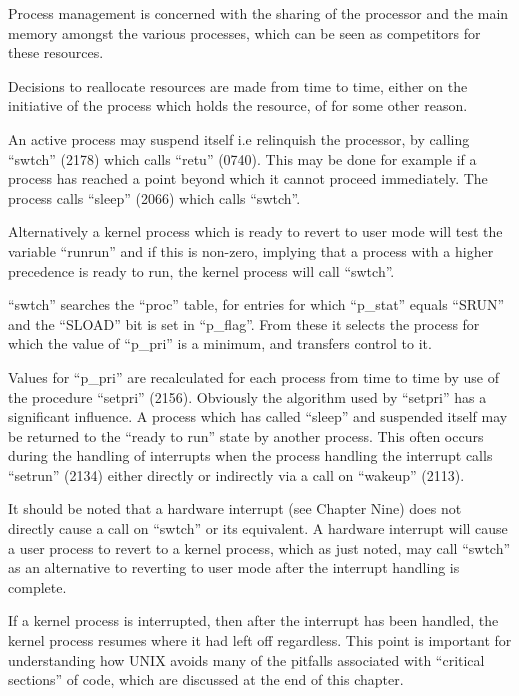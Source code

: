 %
%

Process management is concerned with
the sharing of the processor and the
main memory amongst the various
processes, which can be seen as competitors for these resources.

Decisions to reallocate resources are
made from time to time, either on the
initiative of the process which holds
the resource, of for some other reason.



An active process may suspend itself
i.e relinquish the processor, by calling ``swtch'' (2178) which calls ``retu''
(0740).
This may be done for example if a process has reached a point beyond which
it cannot proceed immediately. The process calls ``sleep'' (2066) which calls
``swtch''.

Alternatively a kernel process which is
ready to revert to user mode will test
the variable ``runrun'' and if this is
non-zero, implying that a process with
a higher precedence is ready to run,
the kernel process will call ``swtch''.

``swtch'' searches the ``proc'' table, for
entries for which ``p\_stat'' equals
``SRUN'' and the ``SLOAD'' bit is set in
``p\_flag''. From these it selects the
process for which the value of ``p\_pri''
is a minimum, and transfers control to it.

Values for ``p\_pri'' are recalculated for
each process from time to time by use
of the procedure ``setpri'' (2156). Obviously the algorithm used by ``setpri''
has a significant influence.
A process which has called ``sleep'' and
suspended itself may be returned to the
``ready to run'' state by another process. This often occurs during the
handling of interrupts when the process
handling the interrupt calls ``setrun''
(2134) either directly or indirectly
via a call on ``wakeup'' (2113).



It should be noted that a hardware
interrupt (see Chapter Nine) does not
directly cause a call on ``swtch'' or its
equivalent. A hardware interrupt will
cause a user process to revert to a
kernel process, which as just noted,
may call ``swtch'' as an alternative to
reverting to user mode after the interrupt handling is complete.

If a kernel process is interrupted,
then after the interrupt has been handled, the kernel process resumes where
it had left off regardless. This point
is important for understanding how UNIX
avoids many of the pitfalls associated
with ``critical sections'' of code, which
are discussed at the end of this
chapter.


